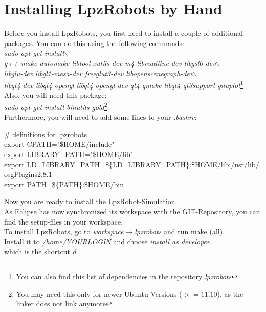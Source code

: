 \section{Installing LpzRobots by Hand}


Before you install LpzRobots, you first need to install a couple of additional packages. You can do this using the following commands:\\
\emph{sudo apt-get install$\backslash$ \\
 g++  make  automake libtool xutils-dev m4  libreadline-dev  libgsl0-dev$\backslash$ \\
 libglu-dev libgl1-mesa-dev freeglut3-dev  libopenscenegraph-dev$\backslash$ \\
 libqt4-dev libqt4-opengl libqt4-opengl-dev qt4-qmake  libqt4-qt3support gnuplot}\footnote{You can also find this list of dependencies in the repository \emph{lpzrobots}}\\
Also, you will need this package: \\
\emph{sudo apt-get install binutils-gold}\footnote{You may need this only for newer Ubuntu-Versions ($>=11.10$), as the linker does not link anymore} \\
Furthermore, you will need to add some lines to your \emph{.bashrc}: \\
\small{
\begin{tabbing}
\# definitions for lpzrobots \\
   export CPATH="\$HOME$/$include"\\
  export LIBRARY\_PATH="\$HOME$/$lib"\\
  export LD\_LIBRARY\_PATH=\$\{LD\_LIBRARY\_PATH\}:\$HOME$/$lib:$/$usr$/$lib$/$osgPlugins2.8.1\\
  export PATH=\$\{PATH\}:\$HOME$/$bin\\
\end{tabbing}}
Now you are ready to install the LpzRobot-Simulation. \\
As Eclipse has now synchronized its workspace with the GIT-Repository, you can find the setup-files in your workspace.\\ To install LpzRobots, go to \emph{workspace}$\rightarrow$\emph{lpzrobots}
and run make (all). \\
Install it to \emph{/home/YOURLOGIN} and choose \emph{install as developer},\\ which is the shortcut \emph{d}